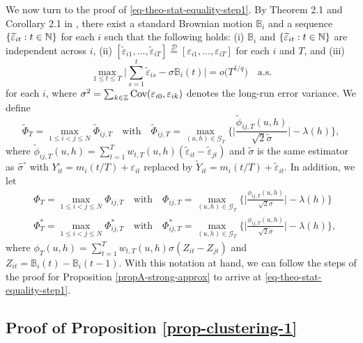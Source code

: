 We now turn to the proof of \eqref{eq-theo-stat-equality-step1}. By Theorem 2.1 and Corollary 2.1 in \cite{BerkesLiuWu2014}, there exist a standard Brownian motion $\mathbb{B}_i$ and a sequence $\{ \widetilde{\varepsilon}_{it}: t \in \mathbb{N} \}$ for each $i$ such that the following holds: (i) $\mathbb{B}_i$ and $\{ \widetilde{\varepsilon}_{it}: t \in \mathbb{N} \}$ are independent across $i$, (ii) $[\widetilde{\varepsilon}_{i1},\ldots,\widetilde{\varepsilon}_{iT}] \stackrel{\mathcal{D}}{=} [\varepsilon_{i1},\ldots,\varepsilon_{iT}]$ for each $i$ and $T$, and (iii)  
\begin{equation*}
\max_{1 \le t \le T} \Big| \sum\limits_{s=1}^t \widetilde{\varepsilon}_{is} - \sigma \mathbb{B}_i(t) \Big| = o\big( T^{1/q} \big) \quad \text{a.s.}  
\end{equation*}
for each $i$, where $\sigma^2 = \sum_{k \in \mathbb{Z}} \textnormal{Cov}(\varepsilon_{i0}, \varepsilon_{ik})$ denotes the long-run error variance. We define 
\[ \widetilde{\Phi}_T = \max_{1\le i < j \le N} \widetilde{\Phi}_{ij,T} \quad \text{with} \quad \widetilde{\Phi}_{ij,T} = \max_{(u,h) \in \mathcal{G}_T} \Big\{ \Big|\frac{\widetilde{\phi}_{ij,T}(u,h)}{\sqrt{2}\widetilde{\sigma}}\Big| - \lambda(h) \Big\}, \]
where $\widetilde{\phi}_{ij,T}(u,h) = \sum\nolimits_{t=1}^T w_{t,T}(u,h) (\widetilde{\varepsilon}_{it} - \widetilde{\varepsilon}_{jt})$ and $\widetilde{\sigma}$ is the same estimator as $\widehat{\sigma}^\circ$ with $Y_{it}^\circ = m_i(t/T) + \varepsilon_{it}$ replaced by  $\widetilde{Y}_{it} = m_i(t/T) + \widetilde{\varepsilon}_{it}$. In addition, we let 
\begin{align*} 
 & \Phi_T = \max_{1\le i < j \le N} \Phi_{ij,T} \quad \text{with} \quad \Phi_{ij,T} = \max_{(u,h) \in \mathcal{G}_T} \Big\{ \Big|\frac{\phi_{ij,T}(u,h)}{\sqrt{2}\sigma}\Big| - \lambda(h) \Big\} \\
 & \Phi_T^* = \max_{1\le i < j \le N} \Phi_{ij,T}^* \quad \text{with} \quad \Phi_{ij,T}^* = \max_{(u,h) \in \mathcal{G}_T} \Big\{ \Big|\frac{\phi_{ij,T}(u,h)}{\sqrt{2}\widetilde{\sigma}}\Big| - \lambda(h) \Big\}, 
\end{align*}
where $\phi_T(u,h) = \sum\nolimits_{t=1}^T w_{t,T}(u,h) \sigma (Z_{it} - Z_{jt})$ and $Z_{it} = \mathbb{B}_i(t) - \mathbb{B}_i(t-1)$. With this notation at hand, we can follow the steps of the proof for Proposition \ref{propA-strong-approx} to arrive at \eqref{eq-theo-stat-equality-step1}. 



\subsection*{Proof of Proposition \ref{prop-clustering-1}}



